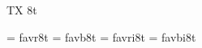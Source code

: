 
\ifx\ffdecl\undefined  \fi

\ffdecl [ArevSans] {} {\rm \bf \it \bi} {} {TX} {8t}

\ismacro{}\ifttrue

   \font\tenrm = favr8t  \sizespec
   \font\tenbf = favb8t  \sizespec
   \font\tenit = favri8t \sizespec
   \font\tenbi = favbi8t \sizespec

   \let\ffnamegen=\undefined %

\fi
\tenrm %

\ifx\loadmathfonts\relax \endinput \fi
\ifx\mathpreloaded X\else  \fi                     

\endinput
